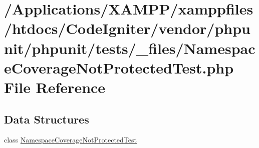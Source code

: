 \hypertarget{phpunit_2tests_2__files_2_namespace_coverage_not_protected_test_8php}{}\section{/\+Applications/\+X\+A\+M\+P\+P/xamppfiles/htdocs/\+Code\+Igniter/vendor/phpunit/phpunit/tests/\+\_\+files/\+Namespace\+Coverage\+Not\+Protected\+Test.php File Reference}
\label{phpunit_2tests_2__files_2_namespace_coverage_not_protected_test_8php}
\subsection*{Data Structures}
\begin{DoxyCompactItemize}
\item 
class \mbox{\hyperlink{class_namespace_coverage_not_protected_test}{Namespace\+Coverage\+Not\+Protected\+Test}}
\end{DoxyCompactItemize}
